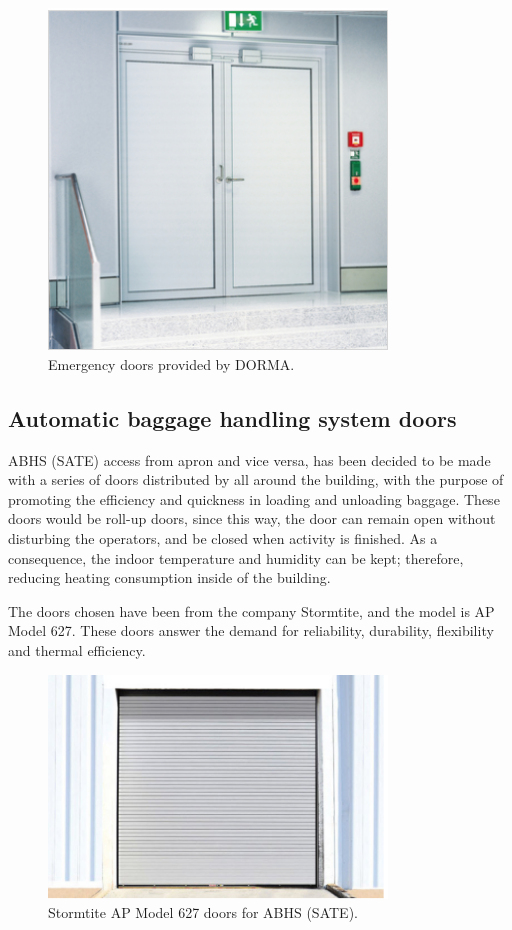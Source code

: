 		\begin{figure}[H]
	\centering
\includegraphics[width=9cm]{./images/Facade/emergencydoor}
\caption{Emergency doors provided by DORMA.}
\end{figure}
		\subsection{Automatic baggage handling system doors}
	ABHS (SATE) access from apron and vice versa, has been decided to be made with a series of doors distributed by all around the building, with the purpose of promoting the efficiency and quickness in loading and unloading baggage. These doors would be roll-up doors, since this way, the door can remain open without disturbing the operators, and be closed when activity is finished. As a consequence, the indoor temperature and humidity can be kept; therefore, reducing heating consumption inside of the building.
	
	The doors chosen have been from the company Stormtite, and the model is AP Model 627. These doors answer the demand for reliability, durability, flexibility and thermal efficiency. 
	
			\begin{figure}[H]
	\centering
\includegraphics[width=9cm]{./images/Facade/sate}
\caption{Stormtite AP Model 627 doors for ABHS (SATE).}
\end{figure}
	
	
